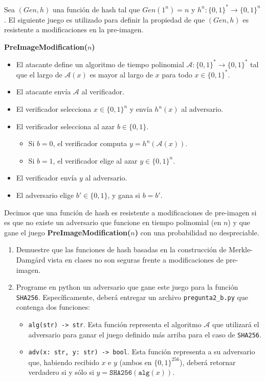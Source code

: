 
Sea $(\textit{Gen}, h)$ una función de hash tal que $\textit{Gen}(1^n) = n$ y  $h^n : \{0,1\}^* \to \{0,1\}^n$. El siguiente juego es utilizado para definir la propiedad de que $(\textit{Gen}, h)$ es resistente a modificaciones en la pre-imagen.

{\bf PreImageModification($n$)}
\begin{itemize}
\item El atacante define un algoritmo de tiempo polinomial $\mathcal{A}:\{0,1\}^*\rightarrow\{0,1\}^*$ tal que el largo de $\mathcal{A}(x)$ es mayor al largo de $x$ para todo $x\in\{0,1\}^*$.
\item El atacante envía $\mathcal{A}$ al verificador.
\item El verificador selecciona $x\in\{0, 1\}^n$ y envía $h^n(x)$ al adversario.
\item El verificador selecciona al azar $b\in\{0, 1\}$.
\begin{itemize}
\item Si $b=0$, el verificador computa $y=h^n(\mathcal{A}(x))$.
\item Si $b=1$, el verificador elige al azar $y\in\{0,1\}^n$.
\end{itemize}
\item El verificador envía $y$ al adversario.
\item El adversario elige $b'\in\{0,1\}$, y gana si $b=b'$.
\end{itemize}
Decimos que una función de hash es resistente a modificaciones de pre-imagen si es que no existe un adversario que funcione en tiempo polinomial (en $n$) y que gane el juego {\bf PreImageModification($n$)} con una probabilidad no despreciable.
\begin{enumerate}
\item Demuestre que las funciones de hash basadas en la construcción de Merkle-Damgård vista en clases no son seguras frente a modificaciones de pre-imagen.

\item Programe en python un adversario que gane este juego para la función \texttt{SHA256}. Específicamente, deberá entregar un archivo \texttt{pregunta2\_b.py} que contenga dos funciones:
\begin{itemize}
\item \texttt{alg(str) -> str}. Esta función representa el algoritmo $\mathcal{A}$ que utilizará el adversario para ganar el juego definido más arriba para el caso de \texttt{SHA256}.
\item \texttt{adv(x: str, y: str) -> bool}. Esta función representa a su adversario que, habiendo recibido $x$ e $y$ (ambos en $\{0,1\}^{256}$), deberá retornar verdadero si y sólo si $y=\texttt{SHA256}(\texttt{alg}(x))$.
\end{itemize}

\end{enumerate}
